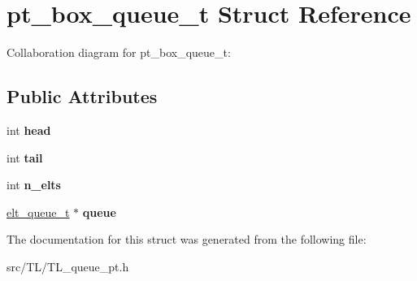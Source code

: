 \hypertarget{structpt__box__queue__t}{}\section{pt\+\_\+box\+\_\+queue\+\_\+t Struct Reference}
\label{structpt__box__queue__t}


Collaboration diagram for pt\+\_\+box\+\_\+queue\+\_\+t\+:
\subsection*{Public Attributes}
\begin{DoxyCompactItemize}
\item 
\mbox{\label{structpt__box__queue__t_a6221ce91c4633bc1e0ec7b00e2795a56}} 
int {\bfseries head}
\item 
\mbox{\label{structpt__box__queue__t_a07ff1d35e40c90fd0bf36f08e0354b4b}} 
int {\bfseries tail}
\item 
\mbox{\label{structpt__box__queue__t_a9a5d517a1df53b62eedd21b607a1161c}} 
int {\bfseries n\+\_\+elts}
\item 
\mbox{\label{structpt__box__queue__t_a9a0b5708a1045cc0d86373b78621e3af}} 
\hyperlink{structelt__queue__t}{elt\+\_\+queue\+\_\+t} $\ast$ {\bfseries queue}
\end{DoxyCompactItemize}


The documentation for this struct was generated from the following file\+:\begin{DoxyCompactItemize}
\item 
src/\+T\+L/T\+L\+\_\+queue\+\_\+pt.\+h\end{DoxyCompactItemize}
